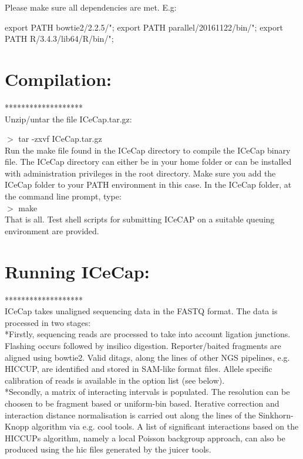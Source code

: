 \documentclass[10pt,a4paper]{article}
\begin{document}
Please make sure all dependencies are met. E.g:

export PATH bowtie2/2.2.5/";
export PATH parallel/20161122/bin/";
export PATH R/3.4.3/lib64/R/bin/";

\section{Compilation:}
*******************\\
Unzip/untar the file ICeCap.tar.gz:

$>$ tar -zxvf ICeCap.tar.gz\\
Run the make file found in the ICeCap directory to compile the ICeCap binary file. The ICeCap directory can either be in your home folder or 
can be installed with administration privileges in the root directory.
Make sure you add the ICeCap folder to your PATH environment in this case.
In the ICeCap folder, at the command line prompt, type:\\

$>$ make\\
That is all. Test shell scripts for submitting ICeCAP on a suitable queuing environment are provided.

\vspace*{1cm}

\section{Running ICeCap:}
*******************\\
ICeCap takes unaligned sequencing data in the FASTQ format.  The data is processed in two stages: \\

*Firstly, sequencing reads are processed to take into account ligation junctions. Flashing occurs followed by insilico digestion. Reporter/baited fragments are aligned using bowtie2.  Valid ditags, along the lines of other NGS pipelines, e.g. HICCUP,  are identified and stored in SAM-like format files. Allele specific calibration of reads is available in the option list (see below).\\

*Secondly, a matrix of interacting intervals is populated. The resolution can be choosen to be fragment based or uniform-bin based. Iterative correction and interaction distance normalisation is carried out along the lines of the Sinkhorn-Knopp algorithm via e.g. cool tools.  A list of significant interactions based on the HICCUPs algorithm, namely a local Poisson backgroup approach, can also be produced using the hic files generated by the juicer tools.
\end{document}
